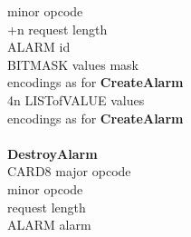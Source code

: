 \begin{tabbing}
				\> minor opcode \\
		+n		\> request length \\
		\> ALARM	\> id \\
		\> BITMASK	\> values mask \\
	\> 	\> encodings as for {\bf CreateAlarm}\\
	\> 4n	\> LISTofVALUE	\> values\\
	\>	\> encodings as for {\bf CreateAlarm}\\
\\
{\bf DestroyAlarm}\\
		\> CARD8	\> major opcode \\
	\> 1			\> minor opcode\footnotemark[1] \\
	\> 2			\> request length \\
		\> ALARM	\> alarm
\end{tabbing}

